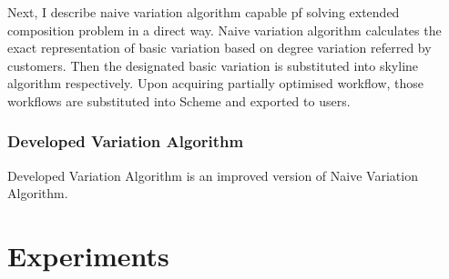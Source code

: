 \documentclass[senior,final,11pt]{iscs-thesis}
\begin{document}
 
 Next, I describe naive variation algorithm capable pf solving extended composition problem in a direct way. Naive variation algorithm calculates the exact representation of basic variation based on degree variation referred by customers. Then the designated basic variation is substituted into skyline algorithm respectively. Upon acquiring partially optimised workflow, those workflows are substituted into Scheme and exported to users. 
 
 

\subsection{Developed Variation Algorithm}%

Developed Variation Algorithm is an improved version of Naive Variation Algorithm. 






\chapter{Experiments}
\end{document}
